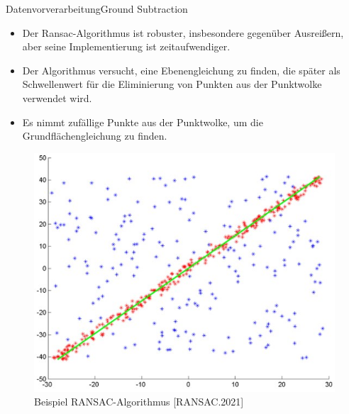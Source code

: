 \documentclass[169, handout	]{THIbeamer} %
\begin{document}
	\begin{frame}{Datenvorverarbeitung}{Ground Subtraction}
		\footnotesize
		\begin{itemize}
			\item Der Ransac-Algorithmus ist robuster, insbesondere gegenüber Ausreißern, aber seine Implementierung ist zeitaufwendiger.		
			\item Der Algorithmus versucht, eine Ebenengleichung zu finden, die später als Schwellenwert für die Eliminierung von Punkten aus der Punktwolke verwendet wird.
			\item Es nimmt zufällige Punkte aus der Punktwolke, um die Grundflächengleichung zu finden. 
		\end{itemize}

		\begin{figure}
			\includegraphics[scale=0.4]{required/RANSAC.jpg}
			\caption{Beispiel RANSAC-Algorithmus [RANSAC.2021]}
        	\label{Clustering}
		\end{figure}
	\end{frame}
\end{document}
